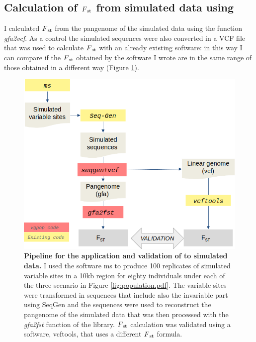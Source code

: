 \subsection{Calculation of  $F\textsubscript{st}$ from simulated data using \vgp}

I calculated $F\textsubscript{st}$ from the pangenome of the simulated data using the \vgpop function \textit{gfa2vcf}. As a control the simulated sequences were also converted in a VCF file that was used to calculate $F\textsubscript{st}$ with an already existing software: in this way I can compare if the $F\textsubscript{st}$ obtained by the software I wrote are in the same range of those obtained in a different way (Figure \ref{fig:pipeline.pdf}). \\


\begin{figure}[H]
\centering
\includegraphics[width=1.00\textwidth]{fig/pipeline.png}
\decoRule
\caption{\textbf{Pipeline for the application and validation of \vgp to simulated data.} I used the software ms to produce 100 replicates of simulated variable sites in a 10kb region for eighty individuals under each of the three scenario in Figure \ref{fig:population.pdf}. The variable sites were transformed in sequences that include also the invariable part using SeqGen and the sequences were used to reconstruct the pangenome of the simulated data that was then processed with the \textit{gfa2fst} function of the \vgp library. $F\textsubscript{st}$ calculation was validated using a software, vcftools, that uses a different $F\textsubscript{st}$ formula. }
\label{fig:pipeline.pdf}
\end{figure}

